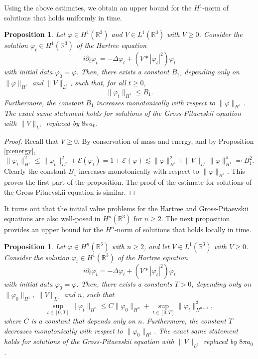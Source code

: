 \documentclass[11pt,a4paper,draft,DIV11]{scrartcl}	%
\newtheorem{prp}[thm]{Proposition}
\newcommand{\R}{\mathds{R}}
\newcommand{\norm}[1]{\lVert#1\rVert}	%
\begin{document}
Using the above estimates, we obtain an upper bound for the $H^1$-norm of
solutions that holds uniformly in time.


\begin{prp} \label{p:reg1}
  Let $\varphi \in H^1(\R^3)$ and $V \in L^1(\R^3)$ with $V \ge 0$. Consider
  the solution $\varphi_t \in H^1(\R^3)$ of the Hartree equation
  \[
    i \partial_t \varphi_t = - \Delta \varphi_t + (V * |\varphi_t|^2)
    \varphi_t
  \]
  with initial data $\varphi_0 = \varphi$. Then, there exists a constant
  $B_1$, depending only on $\| \varphi \|_{H^1}$ and $\| V \|_{L^1}$, such
  that, for all $t \geq 0$,
  \[
    \norm{\varphi_t}_{H^1} \leq B_1. 
  \]
  Furthermore, the constant $B_1$ increases monotonically with respect to
  $\| \varphi \|_{H^1}$. The exact same statement holds for solutions of the
  Gross-Pitaevskii equation with $\| V \|_{L^1}$ replaced by $8 \pi a_0$.
\end{prp}


\begin{proof}
  Recall that $V \ge 0$. By conservation of mass and energy, and by
  Proposition \ref{p:energy},
  \[
    \| \varphi_t \|_{H^1}^2 \le \| \varphi_t \|_{L^2}^2 +
    \mathcal{E}(\varphi_t) = 1 + \mathcal{E}(\varphi) \apprle \| \varphi
    \|_{H^1}^2 + \| V \|_{L^1} \| \varphi \|_{H^1}^4 \eqqcolon B_1^2.
  \]
  Clearly the constant $B_1$ increases monotonically with respect to $\|
  \varphi \|_{H^1}$. This proves the first part of the proposition. The
  proof of the estimate for solutions of the Gross-Pitaevskii equation is
  similar.
\end{proof}


It turns out that the initial value problems for the Hartree and
Gross-Pitaevskii equations are also well-posed in $H^n(\R^3)$ for $n \ge 2$.
The next proposition provides an upper bound for the $H^n$-norm of solutions
that holds locally in time.


\begin{prp} \label{p:lregn}
  Let $\varphi \in H^n(\R^3)$ with $n \geq 2$, and let $V \in L^1(\R^3)$
  with $V \ge 0$. Consider the solution $\varphi_t \in H^1(\R^3)$ of the
  Hartree equation
  \[
    i \partial_t \varphi_t = - \Delta \varphi_t + (V * |\varphi_t|^2)
    \varphi_t
  \]
  with initial data $\varphi_0 = \varphi$. Then, there exists a constants $T
  > 0$, depending only on $\| \varphi_0 \|_{H^1}$, $\| V \|_{L^1}$ and $n$,
  such that
  \begin{equation}\label{eq:preregularity}
    \sup_{t \in [0,T]} \| \varphi_t \|_{H^n} \le C \| \varphi_0 \|_{H^n} +
    \sup_{t \in [0,T]} \| \varphi_t \|_{H^{n-1}}^3,
  \end{equation}
  where $C$ is a constant that depends only on $n$. Furthermore, the
  constant $T$ decreases monotonically with respect to $\| \varphi_0
  \|_{H^1}$. The exact same statement holds for solutions of the
  Gross-Pitaevskii equation with $\| V \|_{L^1}$ replaced by $8 \pi a_0$.
\end{prp}
\end{document}
